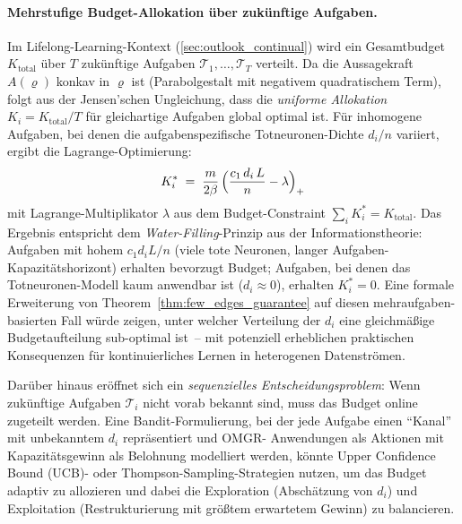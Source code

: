\documentclass[12pt, a4paper, openany]{report}
\begin{document}
\paragraph{Mehrstufige Budget-Allokation über zukünftige Aufgaben.}
Im Lifelong-Learning-Kontext (\cref{sec:outlook_continual}) wird ein
Gesamtbudget $K_{\mathrm{total}}$ über $T$ zukünftige Aufgaben
$\mathcal{T}_1, \ldots, \mathcal{T}_T$ verteilt.  Da die Aussagekraft
$A(\varrho)$ konkav in $\varrho$ ist (Parabolgestalt mit negativem
quadratischem Term), folgt aus der Jensen'schen Ungleichung, dass die
\emph{uniforme Allokation} $K_i = K_{\mathrm{total}}/T$ für gleichartige
Aufgaben global optimal ist.  Für inhomogene Aufgaben, bei denen die
aufgabenspezifische Totneuronen-Dichte $d_i/n$ variiert, ergibt die
Lagrange-Optimierung:
\[
  K_i^*
  \;=\; \frac{m}{2\beta}\,\Bigl(\frac{c_{1}\,d_i\,L}{n} - \lambda\Bigr)_+
\]
mit Lagrange-Multiplikator $\lambda$ aus dem Budget-Constraint
$\sum_i K_i^* = K_{\mathrm{total}}$.  Das Ergebnis entspricht dem
\emph{Water-Filling}-Prinzip aus der Informationstheorie: Aufgaben mit
hohem $c_1 d_i L / n$ (viele tote Neuronen, langer Aufgaben-Kapazitätshorizont)
erhalten bevorzugt Budget; Aufgaben, bei denen das Totneuronen-Modell kaum
anwendbar ist ($d_i \approx 0$), erhalten $K_i^* = 0$.  Eine formale
Erweiterung von Theorem~\ref{thm:few_edges_guarantee} auf diesen
mehraufgaben-basierten Fall würde zeigen, unter welcher Verteilung der $d_i$
eine gleichmäßige Budgetaufteilung sub-optimal ist~-- mit potenziell
erheblichen praktischen Konsequenzen für kontinuierliches Lernen in
heterogenen Datenströmen.

Darüber hinaus eröffnet sich ein \emph{sequenzielles Entscheidungsproblem}:
Wenn zukünftige Aufgaben $\mathcal{T}_i$ nicht vorab bekannt sind, muss
das Budget online zugeteilt werden.  Eine Bandit-Formulierung, bei der jede
Aufgabe einen ``Kanal'' mit unbekanntem $d_i$ repräsentiert und OMGR-
Anwendungen als Aktionen mit Kapazitätsgewinn als Belohnung modelliert
werden, könnte Upper Confidence Bound (UCB)- oder Thompson-Sampling-Strategien
nutzen, um das Budget adaptiv zu allozieren und dabei die Exploration
(Abschätzung von $d_i$) und Exploitation (Restrukturierung mit größtem
erwartetem Gewinn) zu balancieren.
\end{document}
